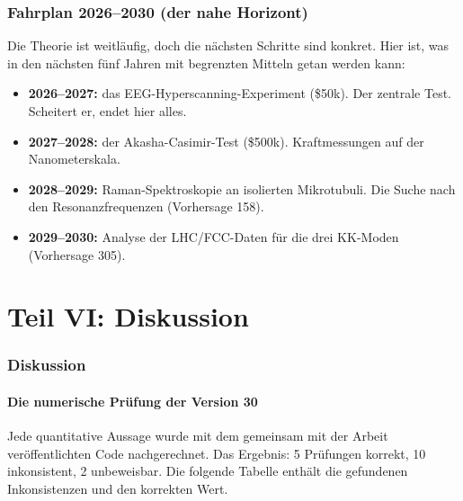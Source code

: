 \documentclass[11pt,a4paper]{article}
\begin{document}
\section{Fahrplan 2026--2030 (der nahe Horizont)}
Die Theorie ist weitläufig, doch die nächsten Schritte sind konkret. Hier ist, was in den nächsten fünf Jahren mit begrenzten Mitteln getan werden kann:
\begin{itemize}
    \item \textbf{2026--2027:} das EEG-Hyperscanning-Experiment (\$50k). Der zentrale Test. Scheitert er, endet hier alles.
    \item \textbf{2027--2028:} der Akasha-Casimir-Test (\$500k). Kraftmessungen auf der Nanometerskala.
    \item \textbf{2028--2029:} Raman-Spektroskopie an isolierten Mikrotubuli. Die Suche nach den Resonanzfrequenzen (Vorhersage 158).
    \item \textbf{2029--2030:} Analyse der LHC/FCC-Daten für die drei KK-Moden (Vorhersage 305).
\end{itemize}

\newpage
\part*{Teil VI: Diskussion}

\section{Diskussion}
\subsection{Die numerische Prüfung der Version 30}
Jede quantitative Aussage wurde mit dem gemeinsam mit der Arbeit veröffentlichten Code nachgerechnet. Das Ergebnis: 5 Prüfungen korrekt, 10 inkonsistent, 2 unbeweisbar. Die folgende Tabelle enthält die gefundenen Inkonsistenzen und den korrekten Wert.
\end{document}
